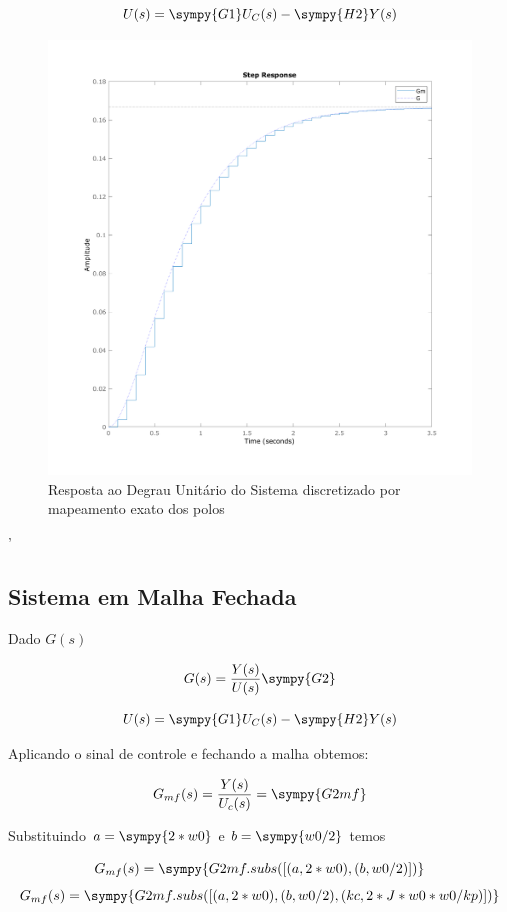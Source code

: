 \documentclass[a4paper,11pt]{article}
\begin{document}
\begin{equation}
    U(s) = \sympy{G1}U_C(s) - \sympy{H2}Y(s)
\end{equation}

\begin{figure}[H]
    \centering
    \includegraphics[width=0.8\linewidth]{img/exsim2-plot-g-matched.png}
    \caption{Resposta ao Degrau Unitário do Sistema discretizado por mapeamento exato dos polos}
\end{figure}
'
\subsection{Sistema em Malha Fechada}

Dado $G(s)$

\begin{equation}
    G(s) = \frac{Y(s)}{U(s)} \sympy{G2}
\end{equation}

\begin{equation}
    U(s) = \sympy{G1}U_C(s) - \sympy{H2}Y(s)
\end{equation}

Aplicando o sinal de controle e fechando a malha obtemos:

$$G_{mf}(s) = \frac{Y(s)}{U_c(s)} = \sympy{G2mf}$$

Substituindo $a = \sympy{2*w0}$ e $b = \sympy{w0/2}$ temos

$$
G_{mf}(s) = \sympy{G2mf.subs([(a,2*w0),(b,w0/2)])}
$$
$$
G_{mf}(s) = \sympy{G2mf.subs([(a,2*w0),(b,w0/2),(kc,2*J*w0*w0/kp)])}
$$
\end{document}
